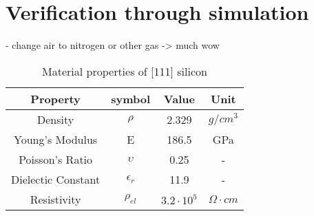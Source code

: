 \section{Verification through simulation}
\label{sec:verification}
- change air to nitrogen or other gas -> much wow

\begin{table}
	\centering
	\begin{tabular}{ |c|c|c|c| } 
		\hline
		Property & symbol & Value & Unit \\
		\hline
		Density & $\rho$ & 2.329 & $g/cm^3$ \\
		Young's Modulus & E & 186.5 & GPa \\ 
		Poisson's Ratio & $\upsilon$ & 0.25 & - \\ 
		Dielectic Constant & $\epsilon_r$ & 11.9 & - \\
		Resistivity & $\rho_{el}$ & $3.2\cdot10^5 $ & $\Omega \cdot cm$ \\
		\hline
	\end{tabular}
	\caption{Material properties of [111] silicon}
	\label{tab:silicium_mat}
\end{table}
